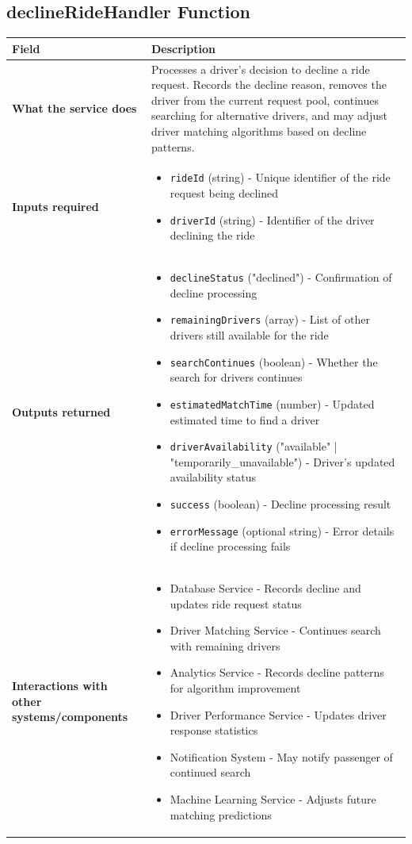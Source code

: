\documentclass[11pt,a4paper]{article}
\begin{document}
\subsection{declineRideHandler Function}

\begin{longtable}{|p{4cm}|p{12cm}|}
\hline
\textbf{Field} & \textbf{Description} \\
\hline
\textbf{What the service does} & 
Processes a driver's decision to decline a ride request. Records the decline reason, removes the driver from the current request pool, continues searching for alternative drivers, and may adjust driver matching algorithms based on decline patterns. \\
\hline
\textbf{Inputs required} & 
\begin{itemize}[nosep]
\item \texttt{rideId} (string) - Unique identifier of the ride request being declined
\item \texttt{driverId} (string) - Identifier of the driver declining the ride
\end{itemize} \\
\hline
\textbf{Outputs returned} & 
\begin{itemize}[nosep]
\item \texttt{declineStatus} ("declined") - Confirmation of decline processing
\item \texttt{remainingDrivers} (array) - List of other drivers still available for the ride
\item \texttt{searchContinues} (boolean) - Whether the search for drivers continues
\item \texttt{estimatedMatchTime} (number) - Updated estimated time to find a driver
\item \texttt{driverAvailability} ("available" | "temporarily\_unavailable") - Driver's updated availability status
\item \texttt{success} (boolean) - Decline processing result
\item \texttt{errorMessage} (optional string) - Error details if decline processing fails
\end{itemize} \\
\hline
\textbf{Interactions with other systems/components} & 
\begin{itemize}[nosep]
\item Database Service - Records decline and updates ride request status
\item Driver Matching Service - Continues search with remaining drivers
\item Analytics Service - Records decline patterns for algorithm improvement
\item Driver Performance Service - Updates driver response statistics
\item Notification System - May notify passenger of continued search
\item Machine Learning Service - Adjusts future matching predictions
\end{itemize} \\
\hline
\end{longtable}
\end{document}
